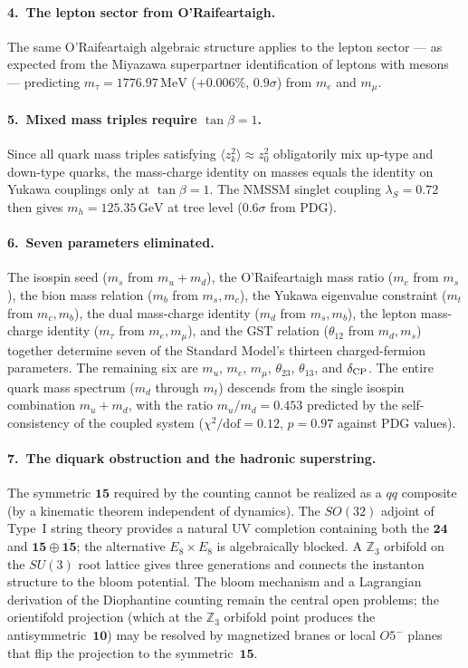 \documentclass[12pt,a4paper]{article}
\newcommand{\MeV}{\,\text{MeV}}
\newcommand{\GeV}{\,\text{GeV}}
\begin{document}
\paragraph{4.\ The lepton sector from O'Raifeartaigh.}
The same O'Raifeartaigh algebraic structure applies to the
lepton sector --- as expected from the Miyazawa superpartner
identification of leptons with mesons --- predicting
$m_\tau = 1776.97\MeV$ ($+0.006\%$, $0.9\sigma$) from
$m_e$ and $m_\mu$.

\paragraph{5.\ Mixed mass triples require $\tan\beta = 1$.}
Since all quark mass triples satisfying $\langle z_k^2\rangle \approx z_0^2$
obligatorily mix up-type and down-type quarks, the mass-charge
identity on masses equals the identity on Yukawa couplings
only at $\tan\beta = 1$. The NMSSM singlet coupling
$\lambda_S = 0.72$ then gives $m_h = 125.35\GeV$ at tree level
($0.6\sigma$ from PDG).

\paragraph{6.\ Seven parameters eliminated.}
The isospin seed ($m_s$ from $m_u + m_d$), the O'Raifeartaigh
mass ratio ($m_c$ from $m_s$), the bion mass relation ($m_b$
from $m_s, m_c$), the Yukawa eigenvalue constraint ($m_t$ from
$m_c, m_b$), the dual mass-charge identity ($m_d$ from $m_s, m_b$),
the lepton mass-charge identity ($m_\tau$ from $m_e, m_\mu$),
and the GST relation ($\theta_{12}$ from $m_d, m_s$)
together determine seven of the Standard Model's thirteen
charged-fermion parameters. The remaining six are $m_u$, $m_e$,
$m_\mu$, $\theta_{23}$, $\theta_{13}$, and $\delta_{\rm CP}$.
The entire quark mass spectrum ($m_d$ through $m_t$) descends
from the single isospin combination $m_u + m_d$, with the
ratio $m_u/m_d = 0.453$ predicted by the self-consistency
of the coupled system ($\chi^2/\text{dof} = 0.12$,
$p = 0.97$ against PDG values).

\paragraph{7.\ The diquark obstruction and the hadronic superstring.}
The symmetric $\mathbf{15}$ required by the counting cannot be
realized as a $qq$ composite (by a kinematic theorem independent of
dynamics). The $SO(32)$ adjoint of Type~I string theory provides a
natural UV completion containing both the $\mathbf{24}$ and
$\mathbf{15} \oplus \overline{\mathbf{15}}$; the alternative
$E_8 \times E_8$ is algebraically blocked. A $\mathbb{Z}_3$ orbifold
on the $SU(3)$ root lattice gives three generations and connects the
instanton structure to the bloom potential. The bloom mechanism
and a Lagrangian derivation of the Diophantine counting remain the
central open problems; the orientifold projection (which at the
$\mathbb{Z}_3$ orbifold point produces the antisymmetric~$\mathbf{10}$)
may be resolved by magnetized branes or local $O5^-$ planes that
flip the projection to the symmetric~$\mathbf{15}$.
\end{document}
